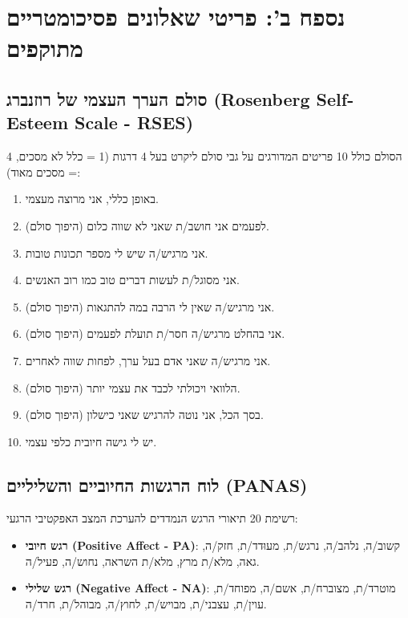 \vspace{0.4cm}
\section*{נספח ב': פריטי שאלונים פסיכומטריים מתוקפים}
\label{app:psychometric_scales}

\subsection*{סולם הערך העצמי של רוזנברג (\textenglish{Rosenberg Self-Esteem Scale - RSES})}
הסולם כולל 10 פריטים המדורגים על גבי סולם ליקרט בעל 4 דרגות (1 = כלל לא מסכים, 4 = מסכים מאוד):
\begin{enumerate}
    \item באופן כללי, אני מרוצה מעצמי.
    \item לפעמים אני חושב/ת שאני לא שווה כלום (היפוך סולם).
    \item אני מרגיש/ה שיש לי מספר תכונות טובות.
    \item אני מסוגל/ת לעשות דברים טוב כמו רוב האנשים.
    \item אני מרגיש/ה שאין לי הרבה במה להתגאות (היפוך סולם).
    \item אני בהחלט מרגיש/ה חסר/ת תועלת לפעמים (היפוך סולם).
    \item אני מרגיש/ה שאני אדם בעל ערך, לפחות שווה לאחרים.
    \item הלוואי ויכולתי לכבד את עצמי יותר (היפוך סולם).
    \item בסך הכל, אני נוטה להרגיש שאני כישלון (היפוך סולם).
    \item יש לי גישה חיובית כלפי עצמי.
\end{enumerate}

\subsection*{לוח הרגשות החיוביים והשליליים (\textenglish{PANAS})}
רשימת 20 תיאורי הרגש הנמדדים להערכת המצב האפקטיבי הרגעי:
\begin{itemize}
    \item \textbf{רגש חיובי (\textenglish{Positive Affect - PA})}: קשוב/ה, נלהב/ה, נרגש/ת, מעוּדד/ת, חזק/ה, גאה, מלא/ת מרץ, מלא/ת השראה, נחוש/ה, פעיל/ה.
    \item \textbf{רגש שלילי (\textenglish{Negative Affect - NA})}: מוטרד/ת, מצוברח/ת, אשם/ה, מפוחד/ת, עוין/ת, עצבני/ת, מבויש/ת, לחוץ/ה, מבוהל/ת, חרד/ה.
\end{itemize}

